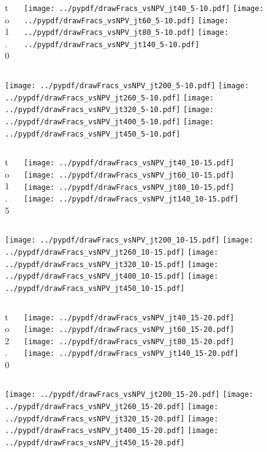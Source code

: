 \documentclass[aspectratio=169]{beamer}
\begin{document}
\begin{figure}[p]
\flushleft
\begin{columns}[T]
\begin{column}{.2\linewidth}
 to 1.0
\end{column}
\begin{column}{.8\linewidth}
\texttt{[image: ../pypdf/drawFracs\_vsNPV\_jt40\_5-10.pdf]}
\texttt{[image: ../pypdf/drawFracs\_vsNPV\_jt60\_5-10.pdf]}
\texttt{[image: ../pypdf/drawFracs\_vsNPV\_jt80\_5-10.pdf]}
\texttt{[image: ../pypdf/drawFracs\_vsNPV\_jt140\_5-10.pdf]}
\end{column}
\end{columns}
\texttt{[image: ../pypdf/drawFracs\_vsNPV\_jt200\_5-10.pdf]}
\texttt{[image: ../pypdf/drawFracs\_vsNPV\_jt260\_5-10.pdf]}
\texttt{[image: ../pypdf/drawFracs\_vsNPV\_jt320\_5-10.pdf]}
\texttt{[image: ../pypdf/drawFracs\_vsNPV\_jt400\_5-10.pdf]}
\texttt{[image: ../pypdf/drawFracs\_vsNPV\_jt450\_5-10.pdf]}
\end{figure}

\begin{figure}[p]
\flushleft
\begin{columns}[T]
\begin{column}{.2\linewidth}
 to 1.5
\end{column}
\begin{column}{.8\linewidth}
\texttt{[image: ../pypdf/drawFracs\_vsNPV\_jt40\_10-15.pdf]}
\texttt{[image: ../pypdf/drawFracs\_vsNPV\_jt60\_10-15.pdf]}
\texttt{[image: ../pypdf/drawFracs\_vsNPV\_jt80\_10-15.pdf]}
\texttt{[image: ../pypdf/drawFracs\_vsNPV\_jt140\_10-15.pdf]}
\end{column}
\end{columns}
\texttt{[image: ../pypdf/drawFracs\_vsNPV\_jt200\_10-15.pdf]}
\texttt{[image: ../pypdf/drawFracs\_vsNPV\_jt260\_10-15.pdf]}
\texttt{[image: ../pypdf/drawFracs\_vsNPV\_jt320\_10-15.pdf]}
\texttt{[image: ../pypdf/drawFracs\_vsNPV\_jt400\_10-15.pdf]}
\texttt{[image: ../pypdf/drawFracs\_vsNPV\_jt450\_10-15.pdf]}
\end{figure}

\begin{figure}[p]
\flushleft
\begin{columns}[T]
\begin{column}{.2\linewidth}
 to 2.0
\end{column}
\begin{column}{.8\linewidth}
\texttt{[image: ../pypdf/drawFracs\_vsNPV\_jt40\_15-20.pdf]}
\texttt{[image: ../pypdf/drawFracs\_vsNPV\_jt60\_15-20.pdf]}
\texttt{[image: ../pypdf/drawFracs\_vsNPV\_jt80\_15-20.pdf]}
\texttt{[image: ../pypdf/drawFracs\_vsNPV\_jt140\_15-20.pdf]}
\end{column}
\end{columns}
\texttt{[image: ../pypdf/drawFracs\_vsNPV\_jt200\_15-20.pdf]}
\texttt{[image: ../pypdf/drawFracs\_vsNPV\_jt260\_15-20.pdf]}
\texttt{[image: ../pypdf/drawFracs\_vsNPV\_jt320\_15-20.pdf]}
\texttt{[image: ../pypdf/drawFracs\_vsNPV\_jt400\_15-20.pdf]}
\texttt{[image: ../pypdf/drawFracs\_vsNPV\_jt450\_15-20.pdf]}
\end{figure}
\end{document}
